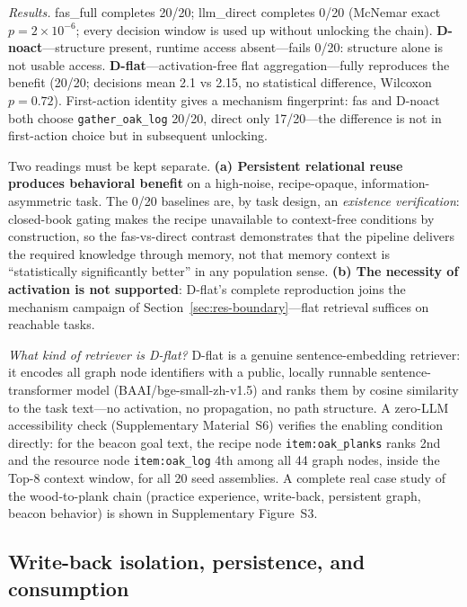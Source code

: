 \documentclass[10pt,a4paper]{article}
\begin{document}
\emph{Results.} fas\_full completes 20/20; llm\_direct completes 0/20 (McNemar exact $p{=}2\times10^{-6}$; every decision window is used up without unlocking the chain). \textbf{D-noact}---structure present, runtime access absent---fails 0/20: structure alone is not usable access. \textbf{D-flat}---activation-free flat aggregation---fully reproduces the benefit (20/20; decisions mean 2.1 vs 2.15, no statistical difference, Wilcoxon $p{=}0.72$). First-action identity gives a mechanism fingerprint: fas and D-noact both choose \texttt{gather\_oak\_log} 20/20, direct only 17/20---the difference is not in first-action choice but in subsequent unlocking.

Two readings must be kept separate. \textbf{(a) Persistent relational reuse produces behavioral benefit} on a high-noise, recipe-opaque, information-asymmetric task. The 0/20 baselines are, by task design, an \emph{existence verification}: closed-book gating makes the recipe unavailable to context-free conditions by construction, so the fas-vs-direct contrast demonstrates that the pipeline delivers the required knowledge through memory, not that memory context is ``statistically significantly better'' in any population sense. \textbf{(b) The necessity of activation is not supported}: D-flat's complete reproduction joins the mechanism campaign of Section~\ref{sec:res-boundary}---flat retrieval suffices on reachable tasks.

\emph{What kind of retriever is D-flat?} D-flat is a genuine sentence-embedding retriever: it encodes all graph node identifiers with a public, locally runnable sentence-transformer model (BAAI/bge-small-zh-v1.5) and ranks them by cosine similarity to the task text---no activation, no propagation, no path structure. A zero-LLM accessibility check (Supplementary Material~S6) verifies the enabling condition directly: for the beacon goal text, the recipe node \texttt{item:oak\_planks} ranks 2nd and the resource node \texttt{item:oak\_log} 4th among all 44 graph nodes, inside the Top-8 context window, for all 20 seed assemblies. A complete real case study of the wood-to-plank chain (practice experience, write-back, persistent graph, beacon behavior) is shown in Supplementary Figure~S3.

\subsection{Write-back isolation, persistence, and consumption}
\label{sec:res-persist}
\end{document}

